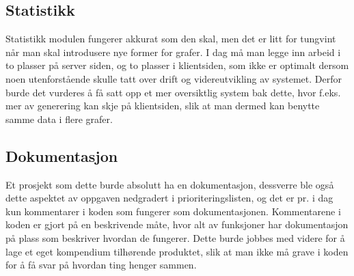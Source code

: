\subsection{Statistikk}
Statistikk modulen fungerer akkurat som den skal, men det er litt for tungvint når man skal introdusere nye former for grafer. I dag må man legge inn arbeid i to plasser på server siden, og to plasser i klientsiden, som ikke er optimalt dersom noen utenforstående skulle tatt over drift og videreutvikling av systemet. Derfor burde det vurderes å få satt opp et mer oversiktlig system bak dette, hvor f.eks. mer av generering kan skje på klientsiden, slik at man dermed kan benytte samme data i flere grafer.

\subsection{Dokumentasjon}
Et prosjekt som dette burde absolutt ha en dokumentasjon, dessverre ble også dette aspektet av oppgaven nedgradert i prioriteringslisten, og det er pr. i dag kun kommentarer i koden som fungerer som dokumentasjonen. Kommentarene i koden er gjort på en beskrivende måte, hvor alt av funksjoner har dokumentasjon på plass som beskriver hvordan de fungerer. Dette burde jobbes med videre for å lage et eget kompendium tilhørende produktet, slik at man ikke må grave i koden for å få svar på hvordan ting henger sammen.